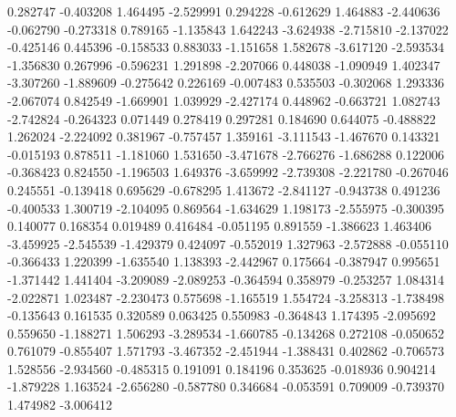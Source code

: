 0.282747
-0.403208
1.464495
-2.529991
0.294228
-0.612629
1.464883
-2.440636
-0.062790
-0.273318
0.789165
-1.135843
1.642243
-3.624938
-2.715810
-2.137022
-0.425146
0.445396
-0.158533
0.883033
-1.151658
1.582678
-3.617120
-2.593534
-1.356830
0.267996
-0.596231
1.291898
-2.207066
0.448038
-1.090949
1.402347
-3.307260
-1.889609
-0.275642
0.226169
-0.007483
0.535503
-0.302068
1.293336
-2.067074
0.842549
-1.669901
1.039929
-2.427174
0.448962
-0.663721
1.082743
-2.742824
-0.264323
0.071449
0.278419
0.297281
0.184690
0.644075
-0.488822
1.262024
-2.224092
0.381967
-0.757457
1.359161
-3.111543
-1.467670
0.143321
-0.015193
0.878511
-1.181060
1.531650
-3.471678
-2.766276
-1.686288
0.122006
-0.368423
0.824550
-1.196503
1.649376
-3.659992
-2.739308
-2.221780
-0.267046
0.245551
-0.139418
0.695629
-0.678295
1.413672
-2.841127
-0.943738
0.491236
-0.400533
1.300719
-2.104095
0.869564
-1.634629
1.198173
-2.555975
-0.300395
0.140077
0.168354
0.019489
0.416484
-0.051195
0.891559
-1.386623
1.463406
-3.459925
-2.545539
-1.429379
0.424097
-0.552019
1.327963
-2.572888
-0.055110
-0.366433
1.220399
-1.635540
1.138393
-2.442967
0.175664
-0.387947
0.995651
-1.371442
1.441404
-3.209089
-2.089253
-0.364594
0.358979
-0.253257
1.084314
-2.022871
1.023487
-2.230473
0.575698
-1.165519
1.554724
-3.258313
-1.738498
-0.135643
0.161535
0.320589
0.063425
0.550983
-0.364843
1.174395
-2.095692
0.559650
-1.188271
1.506293
-3.289534
-1.660785
-0.134268
0.272108
-0.050652
0.761079
-0.855407
1.571793
-3.467352
-2.451944
-1.388431
0.402862
-0.706573
1.528556
-2.934560
-0.485315
0.191091
0.184196
0.353625
-0.018936
0.904214
-1.879228
1.163524
-2.656280
-0.587780
0.346684
-0.053591
0.709009
-0.739370
1.474982
-3.006412
